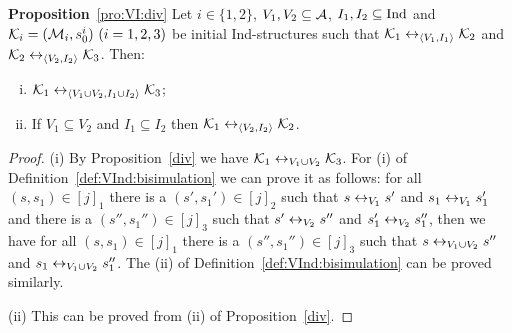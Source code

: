 \documentclass[letterpaper]{article}
\begin{document}

\noindent\textbf{Proposition}~\ref{pro:VI:div}
Let $i\in \{1,2\}$, $V_1,V_2\subseteq\cal A$, $I_1, I_2 \subseteq \textrm{Ind}$
and ${\cal K}_i=({\cal M}_i,s_0^i)~(i=1,2,3)$ be initial Ind-structures
 such that
${\cal K}_1\leftrightarrow_{{\langle{V_1, I_1}\rangle}}{\cal K}_2$ and ${\cal K}_2\leftrightarrow_{{\langle{V_2,I_2}\rangle}}{\cal K}_3$.
 Then:
 \begin{enumerate}[(i)]
   \item ${\cal K}_1\leftrightarrow_{{\langle{V_1\cup V_2, I_1 \cup I_2}\rangle}}{\cal K}_3$;
   \item If $V_1 \subseteq V_2$ and $I_1 \subseteq I_2$ then ${\cal K}_1 \leftrightarrow_{{\langle{V_2, I_2}\rangle}} {\cal K}_2$.
 \end{enumerate}
\begin{proof}
(i) By Proposition~\ref{div} we have ${\cal K}_1\leftrightarrow_{V_1\cup V_2}{\cal K}_3$. For (i) of Definition~\ref{def:VInd:bisimulation} we can prove it as follows:
for all $(s,s_1) \in [j]_1$ there is a $(s', s_1') \in [j]_2$ such that $s\leftrightarrow_{V_1} s'$ and $s_1 \leftrightarrow_{V_1} s_1'$ and there is a $(s'', s_1'') \in [j]_3$ such that $s'\leftrightarrow_{V_2} s''$ and $s_1' \leftrightarrow_{V_2} s_1''$,  then we have for all $(s,s_1) \in [j]_1$ there is a $(s'', s_1'') \in [j]_3$ such that $s  \leftrightarrow_{V_1\cup V_2} s''$ and $s_1 \leftrightarrow_{V_1\cup V_2} s_1''$. The (ii) of Definition~\ref{def:VInd:bisimulation} can be proved similarly.

(ii) This can be proved from (ii) of Proposition~\ref{div}.
\end{proof}
\end{document}
